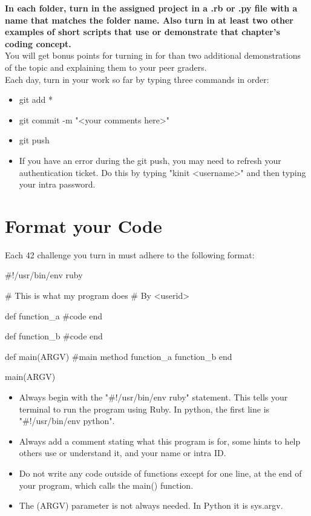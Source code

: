 \documentclass{42-en}
\begin{document}
\textbf{In each folder, turn in the assigned project in a .rb or .py file with a name that matches the folder name. Also turn in at least two other examples of short scripts that use or demonstrate that chapter's coding concept.}\\

You will get bonus points for turning in for than two additional demonstrations of the topic and explaining them to your peer graders.\\

Each day, turn in your work so far by typing three commands in order: 
	\begin{itemize}
		\item git add *
		\item git commit -m "<your comments here>"
		\item git push
		\item If you have an error during the git push, you may need to refresh your authentication ticket. Do this by typing "kinit <username>" and then typing your intra password.
	\end{itemize}


\chapter{Format your Code}

Each 42 challenge you turn in must adhere to the following format:

\begin{42rbcode}
#!/usr/bin/env ruby

# This is what my program does
# By <userid>

def function_a
 #code
end

def function_b
 #code
end

def main(ARGV)
 #main method
 function_a
 function_b
end

main(ARGV)
\end{42rbcode}

\begin{itemize}
	\item Always begin with the "\#!/usr/bin/env ruby" statement. This tells your terminal to run the program using Ruby. In python, the first line is "\#!/usr/bin/env python".
	\item Always add a comment stating what this program is for, some hints to help others use or understand it, and your name or intra ID.
	\item Do not write any code outside of functions except for one line, at the end of your program, which calls the main() function.
	\item The (ARGV) parameter is not always needed. In Python it is sys.argv.
\end{itemize}
\end{document}
